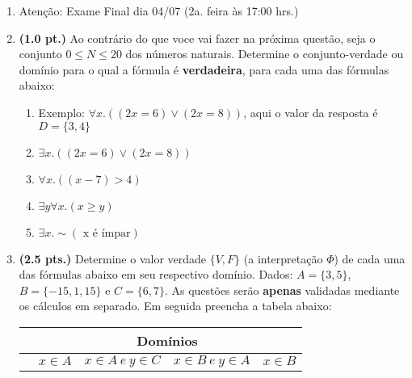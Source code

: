 \documentclass[a4paper,11pt]{article}
\begin{document}
\begin{enumerate}
\setlength{\itemsep}{-1pt}

\item Atenção: Exame Final dia 04/07 (2a. feira às 17:00 hrs.)


\item {\bf (1.0 pt.)} Ao contrário  do que voce vai fazer na próxima questão,
seja o conjunto $0 \leq N\leq 20$ dos números naturais. Determine o conjunto-verdade ou domínio para o qual a fórmula é \textbf{verdadeira},  
para cada  uma das fórmulas abaixo:

\begin{enumerate}
\itemsep -2pt
   \item Exemplo: $\forall x . ((2x = 6) \vee (2x = 8)) $,  aqui o valor da resposta é $D=\{3, 4\}$
  \item $\exists x . ((2x = 6) \vee (2x = 8)) $
      \item $\forall x . ((x - 7) > 4 )$
       \item $\exists y \forall x . (x  \geq y)$
     \item $\exists x . \sim (\text{ x é ímpar})$ 
 \end{enumerate} 



\item {\bf (2.5 pts.)} Determine o valor verdade $\{V, F \}$ (a interpretação $\Phi $)
de cada uma das fórmulas abaixo em seu respectivo domínio. Dados: $A = \{ 3,  5 \}$, $B = \{ -15, 1, 15\}$ e  $C = \{ 6,  7 \}$.
As questões serão \textbf{apenas} validadas mediante os cálculos em separado. Em seguida preencha a tabela abaixo:


\begin{center}
\begin{tabular}{l|c|c|c|c} \hline \hline
 & \multicolumn{4}{c}{Domínios} \\ \hline
 & $ x \in A$ & $x \in A ~e~ y \in C$ & $x \in B ~e~ y \in A$ & $x \in B$ \\ \hline


\end{tabular}
\end{center}
\end{enumerate}
\end{document}
